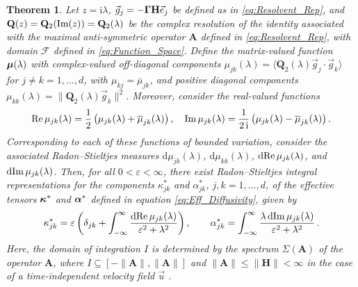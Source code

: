 \documentclass[11pt]{amsart}
\newcommand{\I}{\mathrm{i}}
\renewcommand{\d}{\mathrm{d}}
\newcommand{\Hb}{\mathbf{H}}
\newcommand{\Ab}{\mathbf{A}}
\newcommand{\Qb}{\mathbf{Q}}
\newcommand{\Fs}{\mathscr{F}}
\newcommand\bmu{\mbox{\boldmath${\mu}$}}
\newcommand\balpha{\mbox{\boldmath${\alpha}$}}
\newcommand\bkappa{\mbox{\boldmath${\kappa}$}}
\newcommand\bGamma{\mbox{\boldmath${\Gamma}$}}
\newtheorem{theorem}{Theorem}[section]
\begin{document}
\begin{theorem}\label{thm:Integral_Reps}
%
Let $z=\I\lambda$, $\vec{g}_j=-\bGamma\Hb\vec{e}_j$ be defined as in
\eqref{eq:Resolvent_Rep}, and $\Qb(z)=\Qb_2({\rm Im}(z))=\Qb_2(\lambda)$ be 
the complex resolution of the identity associated with the maximal
anti-symmetric operator $\Ab$ defined in \eqref{eq:Resolvent_Rep}, with
domain $\Fs$ defined in \eqref{eq:Function_Space}. Define the
matrix-valued function $\bmu(\lambda)$ with complex-valued off-diagonal
components $\mu_{jk}(\lambda)=\langle\Qb_2(\lambda)\vec{g}_j\cdot\vec{g}_k\rangle$ for $j\neq k=1,\ldots,d$,
with $\mu_{kj}=\overline{\mu}_{jk}$, and positive diagonal components
$\mu_{kk}(\lambda)=\|\Qb_2(\lambda)\vec{g}_k\|^2$.  Moreover, consider the real-valued
functions   
%
\begin{align}\label{eq:Fns_Bounded_Var}
  {\rm Re}\,\mu_{jk}(\lambda)
         =\frac{1}{2}\left(\mu_{jk}(\lambda)+\overline{\mu}_{jk}(\lambda)\right), \quad
  {\rm Im}\,\mu_{jk}(\lambda)
         =\frac{1}{2\,\I}\left(\mu_{jk}(\lambda)-\overline{\mu}_{jk}(\lambda)\right).
\end{align}
%
Corresponding to each of these functions of bounded variation, 
consider the associated 
Radon--Stieltjes measures $\d\mu_{jk}(\lambda)$, $\d\mu_{kk}(\lambda)$, $\d{\rm
  Re}\,\mu_{jk}(\lambda)$, and $\d{\rm Im}\,\mu_{jk}(\lambda)$. Then, for all $0<\varepsilon<\infty$,
there exist Radon--Stieltjes integral representations for the
components $\kappa^*_{jk}$ and $\alpha^*_{jk}$, $j,k=1,\ldots,d$, of the effective
tensors $\bkappa^*$ and $\balpha^*$ defined in equation
\eqref{eq:Eff_Diffusivity}, given by          
%
\begin{align}\label{eq:Integral_Rep_kappa*}
  \kappa^*_{jk}=\varepsilon\left(\delta_{jk}+\int_{-\infty}^\infty\frac{\d{\rm Re}\,\mu_{jk}(\lambda)}{\varepsilon^2+\lambda^2}\right),
  \qquad
  \alpha^*_{jk}=\int_{-\infty}^\infty\frac{\lambda\,\d{\rm Im}\,\mu_{jk}(\lambda)}{\varepsilon^2+\lambda^2}\,.       
\end{align}
%
Here, the domain of integration $I$ is determined by the spectrum
$\Sigma(\Ab)$ of the operator $\Ab$, where $I\subseteq[-\|\Ab\|,\|\Ab\|]$ and
$\|\Ab\|\leq\|\Hb\|<\infty$ in the case of a time-independent velocity field
$\vec{u}$ \cite{Reed-1980}.     
%
\end{theorem}
\end{document}
